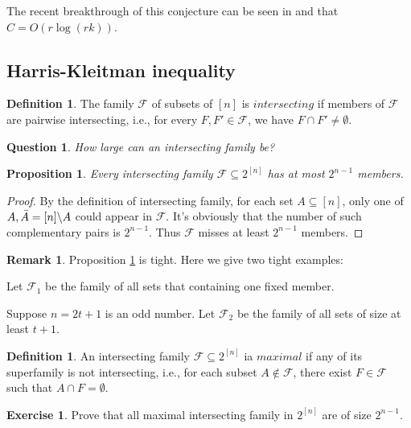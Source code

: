 \documentclass{article}
\newtheorem{proposition}[theorem]{Proposition}
\newtheorem{question}[theorem]{Question}
\theoremstyle{definition}
\newtheorem{remark}[theorem]{Remark}
\newtheorem{definition}[theorem]{Definition}
\newtheorem{exercise}[theorem]{Exercise}
\begin{document}
The recent breakthrough of this conjecture can be seen in \cite{Alweiss2019ImprovedBF} and \cite{Rao2019CodingFS} that $C = O(r\log(rk))$.

\subsection{Harris-Kleitman inequality}
\begin{definition}
    The family $\mathcal{F}$ of subsets of $[n]$ is $intersecting$ if members of $\mathcal{F}$ are pairwise intersecting, i.e., for every $F, F' \in \mathcal{F}$, we have $F \cap F' \neq \emptyset$.
\end{definition}

\begin{question}
    How large can an intersecting family be?
\end{question}

\begin{proposition}{}{}\label{prop16-1}
    Every intersecting family $\mathcal{F} \subseteq 2^{[n]}$ has at most $2^{n-1}$ members.
\end{proposition}
\begin{proof}
    By the definition of intersecting family, for each set $A \subseteq [n]$, only one of $A, \Bar{A} = [n]\backslash A$ could appear in $\mathcal{F}$. It's obviously that the number of such complementary pairs is $2^{n-1}$. Thus $\mathcal{F}$ misses at least $2^{n-1}$ members.
\end{proof}
\begin{remark}
    Proposition \ref{prop16-1} is tight. Here we give two tight examples: 
    
    Let $\mathcal{F}_1$ be the family of all sets that containing one fixed member.
    
    Suppose $n=2t+1$ is an odd number. Let $\mathcal{F}_2$ be the family of all sets of size at least $t+1$.
\end{remark}

\begin{definition}
    An intersecting family $\mathcal{F} \subseteq 2^{[n]}$ ia $maximal$ if any of its superfamily is not intersecting, i.e., for each subset $A \notin \mathcal{F}$, there exist $F \in \mathcal{F}$ such that $A \cap F = \emptyset$.
\end{definition}

\begin{exercise}
    Prove that all maximal intersecting family in $2^{[n]}$ are of size $2^{n-1}$.
\end{exercise}
\end{document}
